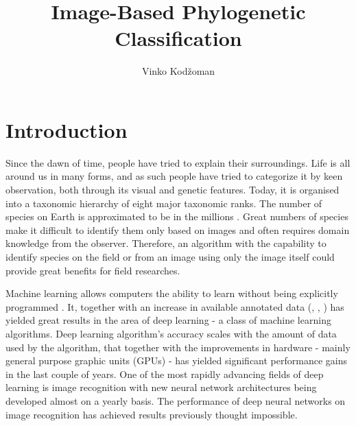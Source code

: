 \documentclass[times, utf8, diplomski]{fer}
\begin{document}
\title{Image-Based Phylogenetic Classification}
\author{Vinko Kodžoman}

\maketitle

\izvornik


\tableofcontents

\chapter{Introduction}
\label{se:introduction}
Since the dawn of time, people have tried to explain their surroundings. Life is all around us in many forms, and as such people have tried to categorize it by keen observation, both through its visual and genetic features. Today, it is organised into a taxonomic hierarchy of eight major taxonomic ranks. The number of species on Earth is approximated to be in the millions \citep{how_many_species_2011}. Great numbers of species make it difficult to identify them only based on images and often requires domain knowledge from the observer. Therefore, an algorithm with the capability to identify species on the field or from an image using only the image itself could provide great benefits for field researches.

Machine learning allows computers the ability to learn without being explicitly programmed \citep{samuel_studies_1959}. It, together with an increase in available annotated data (\cite{cifar}, \cite{imagenet}, \cite{kaggle}) has yielded great results in the area of deep learning - a class of machine learning algorithms. Deep learning algorithm's accuracy scales with the amount of data used by the algorithm, that together with the improvements in hardware - mainly general purpose graphic units (GPUs) - has yielded significant performance gains in the last couple of years. One of the most rapidly advancing fields of deep learning is image recognition \citep{krizhevsky_imagenet_2012, simonyan_very_2014, szegedy_going_2015, he_deep_2016} with new neural network architectures being developed almost on a yearly basis. The performance of deep neural networks on image recognition has achieved results previously thought impossible.
\end{document}

